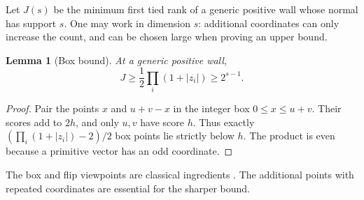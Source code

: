 \documentclass[11pt,a4paper]{article}
\newtheorem{lemma}[theorem]{Lemma}
\theoremstyle{remark}\newtheorem{remark}[theorem]{Remark}
\begin{document}
Let \(J(s)\) be the minimum first tied rank of a generic positive
wall whose normal has support \(s\). One may work in dimension \(s\):
additional coordinates can only increase the count, and can be
chosen large when proving an upper bound.

\begin{lemma}[Box bound]\label{lem:box}
At a generic positive wall,
\[
 J\geq \frac12\prod_i(1+|z_i|)\geq2^{s-1}.
\]
\end{lemma}
\begin{proof}
Pair the points \(x\) and \(u+v-x\) in the integer box
\(0\leq x\leq u+v\). Their scores add to \(2h\), and only \(u,v\)
have score \(h\). Thus exactly
\((\prod_i(1+|z_i|)-2)/2\) box points lie strictly below \(h\).
The product is even because a primitive vector has an odd
coordinate.
\end{proof}

The box and flip viewpoints are classical ingredients
\cite{M99,CCS}. The additional points with repeated coordinates
are essential for the sharper bound.
\end{document}
